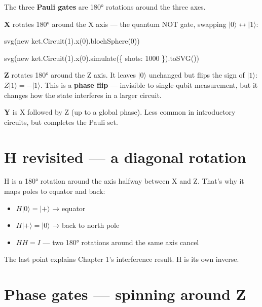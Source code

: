 \documentclass[
  11pt,
  letterpaper,
  oneside]{scrbook}
\newenvironment{Shaded}{\begin{snugshade}}{\end{snugshade}}
\newcommand{\NormalTok}[1]{\textcolor[rgb]{0.00,0.23,0.31}{#1}}
\providecommand{\tightlist}{%
  \setlength{\itemsep}{0pt}\setlength{\parskip}{0pt}}
\begin{document}
The three \textbf{Pauli gates} are 180° rotations around the three axes.

\textbf{X} rotates 180° around the X axis --- the quantum NOT gate,
swapping \(|0\rangle \leftrightarrow |1\rangle\):

\begin{Shaded}
\begin{Highlighting}[]
\NormalTok{svg(new ket.Circuit(1).x(0).blochSphere(0))}
\end{Highlighting}
\end{Shaded}

\begin{Shaded}
\begin{Highlighting}[]
\NormalTok{svg(new ket.Circuit(1).x(0).simulate(\{ shots: 1000 \}).toSVG())}
\end{Highlighting}
\end{Shaded}

\textbf{Z} rotates 180° around the Z axis. It leaves \(|0\rangle\)
unchanged but flips the sign of \(|1\rangle\):
\(Z|1\rangle = -|1\rangle\). This is a \textbf{phase flip} --- invisible
to single-qubit measurement, but it changes how the state interferes in
a larger circuit.

\textbf{Y} is X followed by Z (up to a global phase). Less common in
introductory circuits, but completes the Pauli set.

\section{H revisited --- a diagonal
rotation}\label{h-revisited-a-diagonal-rotation}

H is a 180° rotation around the axis halfway between X and Z. That's why
it maps poles to equator and back:

\begin{itemize}
\tightlist
\item
  \(H|0\rangle = |{+}\rangle\) → equator
\item
  \(H|{+}\rangle = |0\rangle\) → back to north pole
\item
  \(HH = I\) --- two 180° rotations around the same axis cancel
\end{itemize}

The last point explains Chapter 1's interference result. H is its own
inverse.

\section{Phase gates --- spinning around
Z}\label{phase-gates-spinning-around-z}
\end{document}
